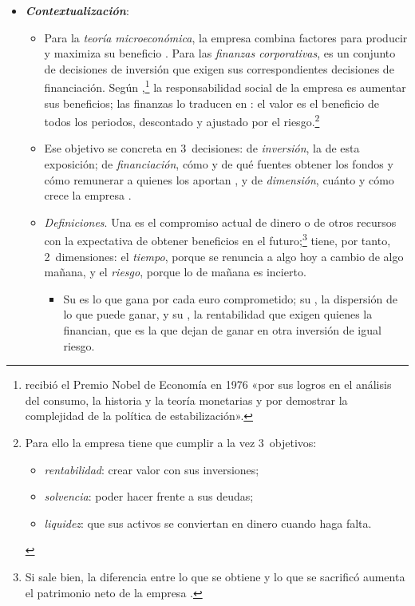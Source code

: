 \documentclass[11pt]{article}
\begin{document}
\begin{itemize}
\item \textbf{\emph{Contextualización}}:
  \begin{itemize}
  \item Para la \emph{teoría microeconómica}, la empresa combina factores para producir y maximiza su beneficio . Para las \emph{finanzas corporativas}, es un conjunto de decisiones de inversión que exigen sus correspondientes decisiones de financiación. Según \textcite{Friedman1970Social},\footnote{ recibió el Premio Nobel de Economía en 1976 «por sus logros en el análisis del consumo, la historia y la teoría monetarias y por demostrar la complejidad de la política de estabilización»\nocite{Nobel1976Friedman}.} la responsabilidad social de la empresa es aumentar sus beneficios; las finanzas lo traducen en \nocite{Jensen2001Value}: el valor es el beneficio de todos los periodos, descontado y ajustado por el riesgo.\footnote{Para ello la empresa tiene que cumplir a la vez 3~objetivos:
\begin{itemize}
\item \emph{rentabilidad}: crear valor con sus inversiones;
\item \emph{solvencia}: poder hacer frente a sus deudas;
\item \emph{liquidez}: que sus activos se conviertan en dinero cuando haga falta.
\end{itemize}}
  \item Ese objetivo se concreta en 3~decisiones: de \emph{inversión}, la de esta exposición; de \emph{financiación}, cómo y de qué fuentes obtener los fondos y cómo remunerar a quienes los aportan , y de \emph{dimensión}, cuánto y cómo crece la empresa .
  \item \emph{Definiciones}. Una  es el compromiso actual de dinero o de otros recursos con la expectativa de obtener beneficios en el futuro\nocite{BodieKaneMarcus2021Investments};\footnote{Si sale bien, la diferencia entre lo que se obtiene y lo que se sacrificó aumenta el patrimonio neto de la empresa .} tiene, por tanto, 2~dimensiones: el \emph{tiempo}, porque se renuncia a algo hoy a cambio de algo mañana, y el \emph{riesgo}, porque lo de mañana es incierto\nocite{SharpeAlexanderBailey1999Investments}.
    \begin{itemize}
    \item Su  es lo que gana por cada euro comprometido; su , la dispersión de lo que puede ganar, y su , la rentabilidad que exigen quienes la financian, que es la que dejan de ganar en otra inversión de igual riesgo.

\end{itemize}
\end{itemize}
\end{itemize}
\end{document}
